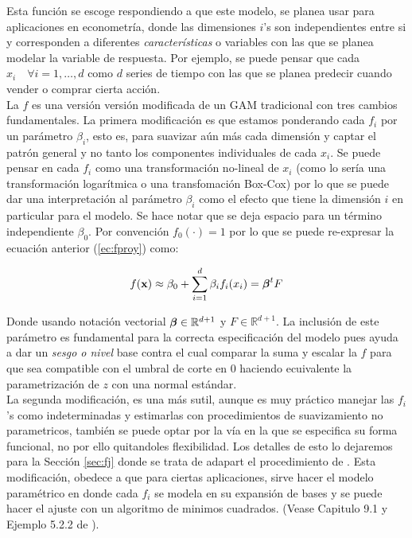 \documentclass[../Main/Main.tex]{subfiles}
\begin{document}
Esta función se escoge respondiendo a que este modelo, se planea usar para aplicaciones en econometría, donde las dimensiones $i$'s son independientes entre si y corresponden a diferentes \textit{características} o variables con las que se planea modelar la variable de respuesta. Por ejemplo, se puede pensar que cada $x_i \quad \forall i=1,\ldots,d$ como $d$ series de tiempo con las que se planea predecir cuando vender o comprar cierta acción.\\

La $f$ es una versión versión modificada de un GAM tradicional con tres cambios fundamentales. La primera modificación es que estamos ponderando cada $f_i$ por un parámetro $\beta_i$, esto es, para suavizar aún más cada dimensión y captar el patrón general y no tanto los componentes individuales de cada $x_i$. Se puede pensar en cada $f_i$ como una transformación no-lineal de $x_i$ (como lo sería una transformación logarítmica o una transfomación Box-Cox) por lo que se puede dar una interpretación al parámetro $\beta_i$ como el efecto que tiene la dimensión $i$ en particular para el modelo. Se hace notar que se deja espacio para un término independiente $\beta_0$. Por convención $f_0(\cdot) = 1$ por lo que se puede re-expresar la ecuación anterior (\ref{ec:fproy}) como:

$$
f(\mathbf{x}) \approx \beta_0 +\sum_{i=1}^d \beta_i f_i(x_i) = \boldsymbol{\beta}^t F
$$

Donde usando notación vectorial $\boldsymbol{\beta}\in\mathbb{R}^{d+1}$ y $F \in\mathbb{R}^{d+1}$. La inclusión de este parámetro es fundamental para la correcta especificación del modelo pues ayuda a dar un \textit{sesgo o nivel} base contra el cual comparar la suma y escalar la $f$ para que sea compatible con el umbral de corte en $0$ haciendo ecuivalente la parametrización de $z$ con una normal estándar. \\

La segunda modificación, es una más sutil, aunque es muy práctico manejar las $f_i$'s como indeterminadas y estimarlas con procedimientos de suavizamiento no parametricos, también se puede optar por la vía en la que se especifica su forma funcional, no por ello quitandoles flexibilidad. Los detalles de esto lo dejaremos para la Sección \ref{sec:fj} donde se trata de adapart el procedimiento de \autocite{mallik1998automatic}. Esta modificación, obedece a que para ciertas aplicaciones, sirve hacer el modelo paramétrico en donde cada $f_i$ se modela en su expansión de bases y se puede hacer el ajuste con un algoritmo de minimos cuadrados. (Vease Capitulo 9.1 y Ejemplo 5.2.2 de \autocite{hastie2008elements}).\\
\end{document}
